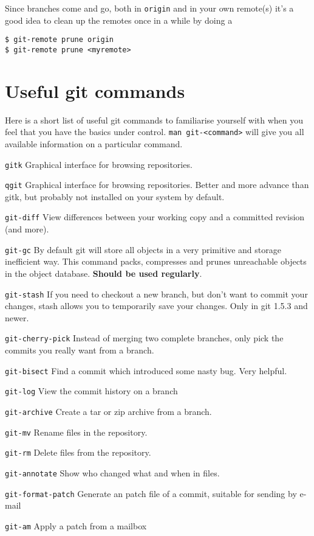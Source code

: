 \documentclass[a4paper,10pt]{article}
\begin{document}
Since branches come and go, both in {\tt origin} and in your own remote(s)
it's a good idea to clean up the remotes once in a while by doing a
\begin{verbatim}
$ git-remote prune origin
$ git-remote prune <myremote>
\end{verbatim}


\section{Useful git commands}
Here is a short list of useful git commands to familiarise yourself with when
you feel that you have the basics under control. {\tt man git-<command>} will
give you all available information on a particular command.
\begin{description}
\item{\tt gitk} Graphical interface for browsing repositories.
\item{\tt qgit} Graphical interface for browsing repositories. Better and more
advance than gitk, but probably not installed on your system by default.
\item{\tt git-diff} View differences between your working copy and a committed
revision (and more).
\item{\tt git-gc} By default git will store all objects in a very primitive
and storage inefficient way. This command packs, compresses and prunes
unreachable objects in the object database. {\bf Should be used regularly}.
\item{\tt git-stash} If you need to checkout a new branch, but don't want to
commit your changes, stash allows you to temporarily save your changes. Only
in git 1.5.3 and newer.
\item{\tt git-cherry-pick} Instead of merging two complete branches, only pick the
commits you really want from a branch.
\item{\tt git-bisect} Find a commit which introduced some nasty bug. Very
helpful.
\item{\tt git-log} View the commit history on a branch
\item{\tt git-archive} Create a tar or zip archive from a branch.
\item{\tt git-mv} Rename files in the repository.
\item{\tt git-rm} Delete files from the repository.
\item{\tt git-annotate} Show who changed what and when in files.
\item{\tt git-format-patch} Generate an patch file of a commit, suitable for
sending by e-mail
\item{\tt git-am} Apply a patch from a mailbox

\end{description}
\end{document}
